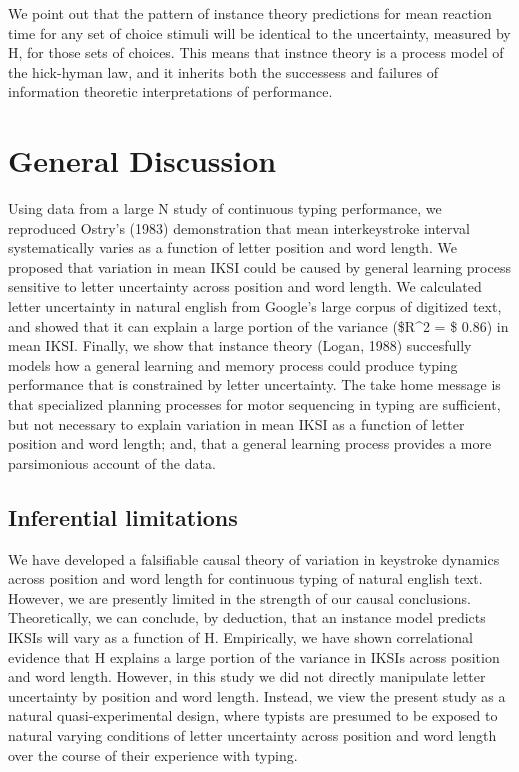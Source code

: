 \documentclass[floatsintext,man]{apa6}
\theoremstyle{definition}
\theoremstyle{definition}
\theoremstyle{definition}
\theoremstyle{remark}
\begin{document}
We point out that the pattern of instance theory predictions for mean
reaction time for any set of choice stimuli will be identical to the
uncertainty, measured by H, for those sets of choices. This means that
instnce theory is a process model of the hick-hyman law, and it inherits
both the successess and failures of information theoretic
interpretations of performance.

\section{General Discussion}\label{general-discussion}

Using data from a large N study of continuous typing performance, we
reproduced Ostry's (1983) demonstration that mean interkeystroke
interval systematically varies as a function of letter position and word
length. We proposed that variation in mean IKSI could be caused by
general learning process sensitive to letter uncertainty across position
and word length. We calculated letter uncertainty in natural english
from Google's large corpus of digitized text, and showed that it can
explain a large portion of the variance (\$R\^{}2 = \$ 0.86) in mean
IKSI. Finally, we show that instance theory (Logan, 1988) succesfully
models how a general learning and memory process could produce typing
performance that is constrained by letter uncertainty. The take home
message is that specialized planning processes for motor sequencing in
typing are sufficient, but not necessary to explain variation in mean
IKSI as a function of letter position and word length; and, that a
general learning process provides a more parsimonious account of the
data.

\subsection{Inferential limitations}\label{inferential-limitations}

We have developed a falsifiable causal theory of variation in keystroke
dynamics across position and word length for continuous typing of
natural english text. However, we are presently limited in the strength
of our causal conclusions. Theoretically, we can conclude, by deduction,
that an instance model predicts IKSIs will vary as a function of H.
Empirically, we have shown correlational evidence that H explains a
large portion of the variance in IKSIs across position and word length.
However, in this study we did not directly manipulate letter uncertainty
by position and word length. Instead, we view the present study as a
natural quasi-experimental design, where typists are presumed to be
exposed to natural varying conditions of letter uncertainty across
position and word length over the course of their experience with
typing.
\end{document}
